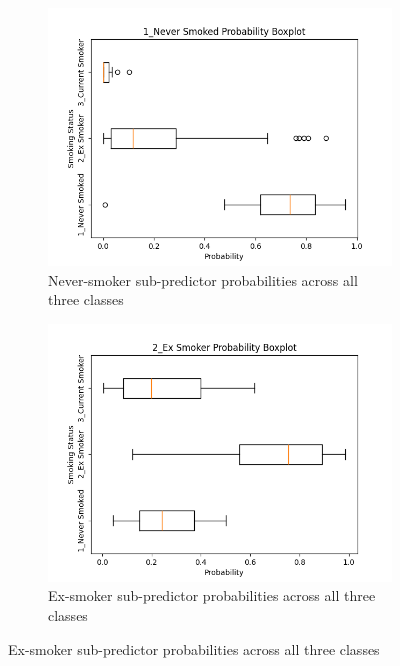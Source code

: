 \documentclass{article}
\begin{document}
\begin{figure}
    \centering
    \begin{subfigure}{0.48\textwidth}
        \centering
        \includegraphics[width=\linewidth]{cohort1_1_boxplot.png}
        \caption{Never-smoker sub-predictor probabilities across all three classes}
    \end{subfigure}
    \hfill
    \begin{subfigure}{0.48\textwidth}
        \centering
        \includegraphics[width=\linewidth]{cohort1_2_boxplot.png}
        \caption{Ex-smoker sub-predictor probabilities across all three classes}
    \end{subfigure}
    \par\vspace{0.5em}

\end{figure}
\end{document}
